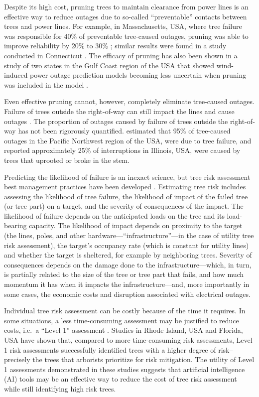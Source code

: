\documentclass[Journal,letterpaper, SingleSpace, InsideFigs]{ascelike-new}
\begin{document}
Despite its high cost, pruning trees to maintain clearance from power lines is an effective way to reduce outages due to so-called ``preventable'' contacts between trees and power lines.  For example, in Massachusetts, USA, where tree failure was responsible for 40\% of preventable tree-caused outages, pruning was able to improve reliability by 20\% to 30\% \cite{simpson1996treecaused}; similar results were found in a study conducted in Connecticut \cite{parent2019analysis}. The efficacy of pruning has also been shown in a study of two states in the Gulf Coast region of the USA that showed wind-induced power outage prediction models becoming less uncertain when pruning was included in the model \cite{nateghi2014power}.

Even effective pruning cannot, however, completely eliminate tree-caused outages. Failure of trees outside the right-of-way can still impact the lines and cause outages \cite{guggenmoos2003effects}. The proportion of outages caused by failure of trees outside the right-of-way has not been rigorously quantified.  estimated that 95\% of tree-caused outages in the Pacific Northwest region of the USA, were due to tree failure, and  reported approximately 25\% of interruptions in Illinois, USA, were caused by trees that uprooted or broke in the stem. 

Predicting the likelihood of failure is an inexact science, but tree risk assessment best management practices have been developed \cite{smiley2017best,goodfellow2020best}. Estimating tree risk includes assessing the likelihood of tree failure, the likelihood of impact of the failed tree (or tree part) on a target, and the severity of consequences of the impact. The likelihood of failure depends on the anticipated loads on the tree and its load-bearing capacity. The likelihood of impact depends on proximity to the target (the lines, poles, and other hardware---``infrastructure''---in the case of utility tree risk assessment), the target’s occupancy rate (which is constant for utility lines) and whether the target is sheltered, for example by neighboring trees. Severity of consequences depends on the damage done to the infrastructure---which, in turn, is partially related to the size of the tree or tree part that fails, and how much momentum it has when it impacts the infrastructure---and, more importantly in some cases, the economic costs and disruption associated with electrical outages.

Individual tree risk assessment can be costly because of the time it requires. In some situations, a less time-consuming assessment may be justified to reduce costs, i.e.\ a ``Level 1'' assessment  \cite{smiley2017best}. Studies in Rhode Island, USA \cite{rooney2005reliability} and Florida, USA \cite{koeser2016frequency} have shown that, compared to more time-consuming risk assessments, Level 1 risk assessments successfully identified trees with a higher degree of risk--precisely the trees that arborists prioritize for risk mitigation. The utility of Level 1 assessments demonstrated in these studies suggests that artificial intelligence (AI) tools may be an effective way to reduce the cost of tree risk assessment while still identifying high risk trees.
\end{document}
